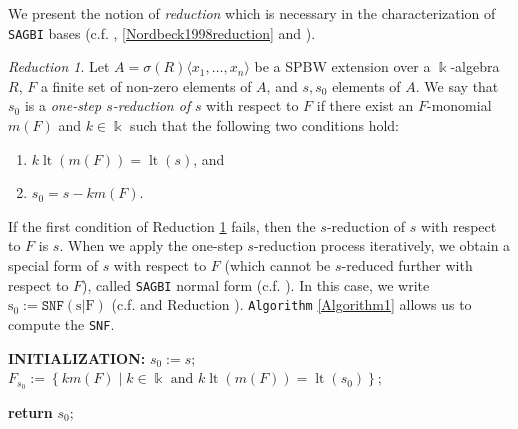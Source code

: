 \documentclass{amsart}
\theoremstyle{definition}
\theoremstyle{remark}
\newtheorem{reduction}{Reduction}[section]
\numberwithin{equation}{section}
\begin{document}
We present the notion of {\em reduction} which is necessary in the characterization of \texttt{SAGBI} bases (c.f. \cite[Definition 6.6.16]{KreuzerRobbiano2005}, \ref{Nordbeck1998reduction} and  \cite[Definition 3]{Khanetal2019}).

\begin{reduction}\label{normalform}
Let $A = \sigma(R)\langle x_1,\dotsc, x_n\rangle$ be a SPBW extension over a $\Bbbk$-algebra $R$, $F$ a finite set of non-zero elements of $A$, and $s, s_0$ elements of $A$. We say that $s_0$ is a \textit{one-step $s$-reduction of} $s$ with respect to $F$ if there exist an $F$-monomial $m(F)$ and $k \in \Bbbk$ such that the following two conditions hold:
\begin{enumerate}
 \item [\rm (i)] $k\operatorname{lt}(m(F))=\operatorname{lt}(s)$, and 
 \item [\rm (ii)] $s_0=s-km(F).$
\end{enumerate}
\end{reduction}

If the first condition of Reduction \ref{normalform} fails, then the $s$-reduction of $s$ with respect to $F$ is $s.$ When we apply the one-step $s$-reduction process iteratively, we obtain a special form of $s$ with respect to $F$ (which cannot be $s$-reduced further with respect to $F$), called \texttt{SAGBI} normal form (c.f. \cite[Proposition 3.2]{LezamaMarin2009}). In this case, we write $\mathrm{s}_{0}:=\texttt{SNF}(\mathrm{s} | \mathrm{F})$ (c.f. \cite[Proposition 3.2]{LezamaMarin2009} and Reduction \cite[Definition 3]{Khanetal2019}). \texttt{Algorithm} \ref{Algorithm1} allows us to compute the \texttt{SNF}. 

\begin{algorithm}\label{Algorithm1}
\caption{}
\textbf{INITIALIZATION:} $s_{0}:=s$;
$F_{s_{0}}:=\left\{k m(F) \mid k \in \Bbbk \text { and } k\operatorname{lt}( m(F))=\operatorname{lt}\left(s_{0}\right)\right\}$;
\BlankLine

\textbf{return} $s_0$;
\end{algorithm}
\end{document}
